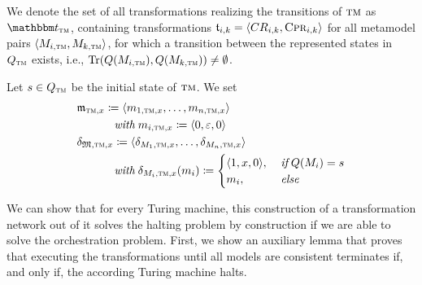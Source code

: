 We denote the set of all transformations realizing the transitions of $\textsc{tm}$ as $\transformationset{T}_{\TuringMachine}$, containing transformations $\transformation{t}_{i,k} = \tupled{\consistencyrelation{CR}{i,k},\consistencypreservationrule{i,k}}$ for all metamodel pairs $\tupled{\metamodel{M}{i,\TuringMachine},\metamodel{M}{k,\TuringMachine}}$, for which a transition between the represented states in $Q_{\textsc{tm}}$ exists, i.e., $\Tr(Q(\metamodel{M}{i,\TuringMachine}),Q(\metamodel{M}{k,\TuringMachine})) \neq \emptyset$.

Let $s \in Q_{\textsc{tm}}$ be the initial state of $\textsc{tm}$. We set
\begin{align*}
    &
    \modeltuple{m}_{\TuringMachine, x} \equalsperdefinition \tupled{\model{m}{1,\TuringMachine,x}, \dots, \model{m}{n,\TuringMachine,x}} \\
    & \formulaskip\formulaskip\formulaskip
    \withmath %
    \model{m}{i, \TuringMachine, x} \equalsperdefinition \tupled{0, \varepsilon, 0} \\
    &
    \changetuple{\metamodeltuple{M},\TuringMachine,x} \equalsperdefinition \tupled{\change{\metamodel{M}{1},\TuringMachine,x}, \dots, \change{\metamodel{M}{n},\TuringMachine,x}} \\
    &
    \formulaskip\formulaskip\formulaskip
    \withmath 
    \change{\metamodel{M}{i},\TuringMachine,x}(\model{m}{i}) \equalsperdefinition 
    \begin{cases}
        \tupled{1,x,0}, & \mathtextspacearound{if} Q(\metamodel{M}{i}) = s\\
        \model{m}{i}, & \mathtextspacearound{else}
    \end{cases}
\end{align*}

We can show that for every Turing machine, this construction of a transformation network out of it solves the halting problem by construction if we are able to solve the orchestration problem.
First, we show an auxiliary lemma that proves that executing the transformations until all models are consistent terminates if, and only if, the according Turing machine halts.

